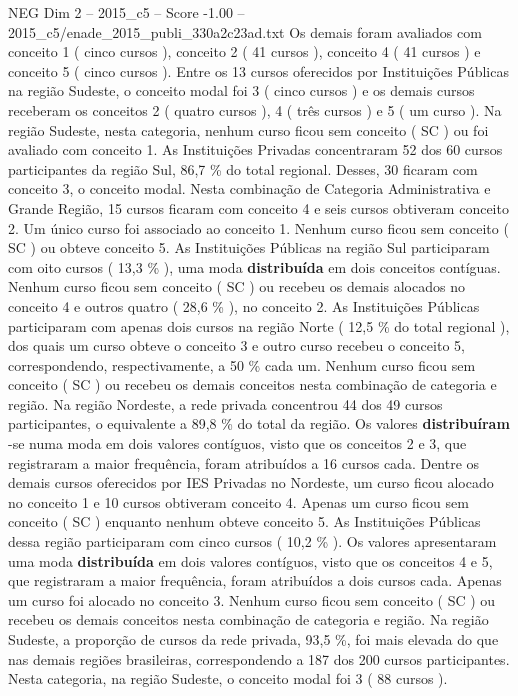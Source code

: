 \begin{textsample}{NEG Dim 2 – 2015\_c5 – Score -1.00 – 2015\_c5/enade\_2015\_publi\_330a2c23ad.txt}
Os demais foram avaliados com conceito 1 ( cinco cursos ), conceito 2 ( 41 cursos ), conceito 4 ( 41 cursos ) e conceito 5 ( cinco cursos ).
Entre os 13 cursos oferecidos por Instituições Públicas na região Sudeste, o conceito modal foi 3 ( cinco cursos ) e os demais cursos receberam os conceitos 2 ( quatro cursos ), 4 ( três cursos ) e 5 ( um curso ).
Na região Sudeste, nesta categoria, nenhum curso ficou sem conceito ( SC ) ou foi avaliado com conceito 1.
As Instituições Privadas concentraram 52 dos 60 cursos participantes da região Sul, 86,7 \% do total regional.
Desses, 30 ficaram com conceito 3, o conceito modal.
Nesta combinação de Categoria Administrativa e Grande Região, 15 cursos ficaram com conceito 4 e seis cursos obtiveram conceito 2.
Um único curso foi associado ao conceito 1.
Nenhum curso ficou sem conceito ( SC ) ou obteve conceito 5.
As Instituições Públicas na região Sul participaram com oito cursos ( 13,3 \% ), uma moda \textbf{distribuída} em dois conceitos contíguas.
Nenhum curso ficou sem conceito ( SC ) ou recebeu os demais alocados no conceito 4 e outros quatro ( 28,6 \% ), no conceito 2.
As Instituições Públicas participaram com apenas dois cursos na região Norte ( 12,5 \% do total regional ), dos quais um curso obteve o conceito 3 e outro curso recebeu o conceito 5, correspondendo, respectivamente, a 50 \% cada um.
Nenhum curso ficou sem conceito ( SC ) ou recebeu os demais conceitos nesta combinação de categoria e região.
Na região Nordeste, a rede privada concentrou 44 dos 49 cursos participantes, o equivalente a 89,8 \% do total da região.
Os valores \textbf{distribuíram} -se numa moda em dois valores contíguos, visto que os conceitos 2 e 3, que registraram a maior frequência, foram atribuídos a 16 cursos cada.
Dentre os demais cursos oferecidos por IES Privadas no Nordeste, um curso ficou alocado no conceito 1 e 10 cursos obtiveram conceito 4.
Apenas um curso ficou sem conceito ( SC ) enquanto nenhum obteve conceito 5.
As Instituições Públicas dessa região participaram com cinco cursos ( 10,2 \% ).
Os valores apresentaram uma moda \textbf{distribuída} em dois valores contíguos, visto que os conceitos 4 e 5, que registraram a maior frequência, foram atribuídos a dois cursos cada.
Apenas um curso foi alocado no conceito 3.
Nenhum curso ficou sem conceito ( SC ) ou recebeu os demais conceitos nesta combinação de categoria e região.
Na região Sudeste, a proporção de cursos da rede privada, 93,5 \%, foi mais elevada do que nas demais regiões brasileiras, correspondendo a 187 dos 200 cursos participantes.
Nesta categoria, na região Sudeste, o conceito modal foi 3 ( 88 cursos ).

\end{textsample}

